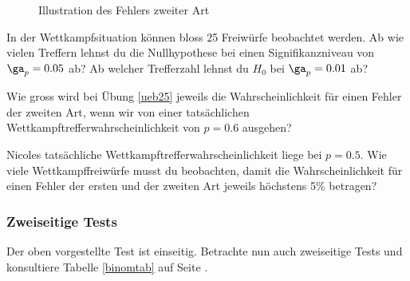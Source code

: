 \documentclass[%
11pt,%
twoside,%
titlepage,%
german,%
headsepline%
]{scrartcl}
\begin{document}
\begin{figure}
\begin{center}
{
}
\end{center}
\caption{Illustration des Fehlers zweiter Art}
\end{figure}

\begin{ueb}\label{ueb25}
In der Wettkampfsituation können bloss 25 Freiwürfe beobachtet werden. Ab wie vielen Treffern lehnst du die Nullhypothese bei einen Signifikanzniveau von $\ga_p = 0.05$ ab? Ab welcher Trefferzahl lehnst du $H_0$ bei $\ga_p = 0.01$ ab?
\end{ueb}

\begin{ueb}
Wie gross wird bei Übung \ref{ueb25} jeweils die Wahrscheinlichkeit für einen Fehler der zweiten Art, wenn wir von einer tatsächlichen Wettkampftrefferwahrscheinlichkeit von $p=0.6$ ausgehen?
\end{ueb}

\begin{ueb}
Nicoles tatsächliche Wettkampftrefferwahrscheinlichkeit liege bei $p=0.5$. Wie viele Wettkampffreiwürfe musst du beobachten, damit die Wahrscheinlichkeit für einen Fehler der ersten und der zweiten Art jeweils höchstens 5\% betragen?
\end{ueb}

\subsubsection{Zweiseitige Tests}

Der
oben vorgestellte Test ist einseitig. Betrachte nun auch zweiseitige Tests und konsultiere Tabelle \ref{binomtab} auf Seite \pageref{binomtab}.
\end{document}
